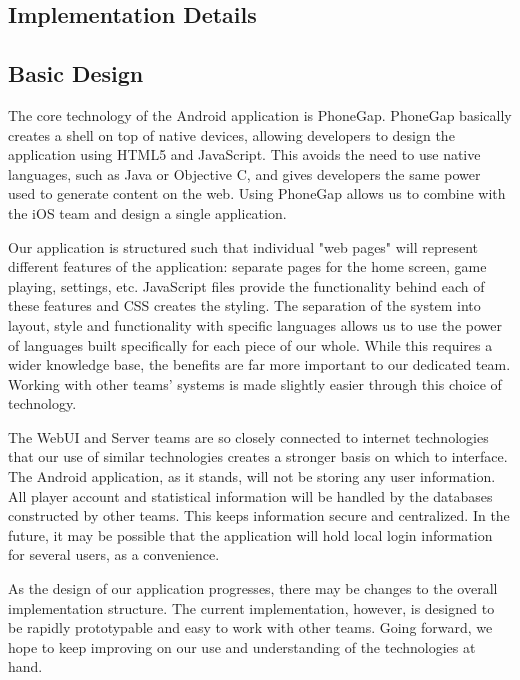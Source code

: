 \documentclass[12pt]{article}
\newenvironment{itemize*}%
  {\begin{itemize}%
  	\setlength{\parsep}{0pt}
    \setlength{\itemsep}{0pt}%
    \setlength{\parskip}{0pt}}%
  {\end{itemize}}
\begin{document}
\begin{itemize*}
\section{Implementation Details}

\subsection{Basic Design}
The core technology of the Android application is PhoneGap\cite{PhoneGap-About}.  PhoneGap basically creates a shell on top of native devices, allowing developers to design the application using HTML5 and JavaScript.  This avoids the need to use native languages, such as Java or Objective C, and gives developers the same power used to generate content on the web.  Using PhoneGap allows us to combine with the iOS team and design a single application.  

Our application is structured such that individual "web pages" will represent different features of the application: separate pages for the home screen, game playing, settings, etc.  JavaScript files provide the functionality behind each of these features and CSS creates the styling.  The separation of the system into layout, style and functionality with specific languages allows us to use the power of languages built specifically for each piece of our whole.  While this requires a wider knowledge base, the benefits are far more important to our dedicated team.  Working with other teams' systems is made slightly easier through this choice of technology.

The WebUI and Server teams are so closely connected to internet technologies that our use of similar technologies creates a stronger basis on which to interface.  The Android application, as it stands, will not be storing any user information.  All player account and statistical information will be handled by the databases constructed by other teams.  This keeps information secure and centralized.  In the future, it may be possible that the application will hold local login information for several users, as a convenience.  

As the design of our application progresses, there may be changes to the overall implementation structure.  The current implementation, however, is designed to be rapidly prototypable and easy to work with other teams.  Going forward, we hope to keep improving on our use and understanding of the technologies at hand.



\end{itemize*}
\end{document}
